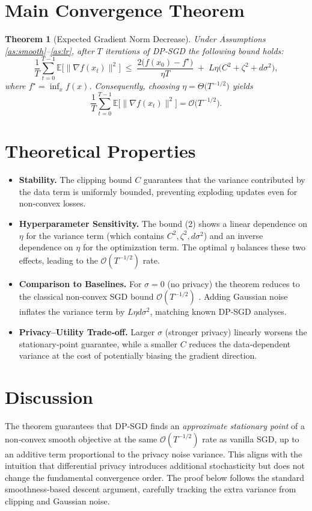 \documentclass[11pt]{article}
\newtheorem{theorem}{Theorem}
\newcommand{\E}{\mathbb{E}}
\newcommand{\grad}{\nabla}
\begin{document}
\section*{Main Convergence Theorem}
\begin{theorem}[Expected Gradient Norm Decrease]\label{thm:main}
Under Assumptions \ref{as:smooth}–\ref{as:lr}, after $T$ iterations of DP‑SGD the following bound holds:
\[
\frac{1}{T}\sum_{t=0}^{T-1}\E\!\bigl[\|\grad f(x_{t})\|^{2}\bigr]
\;\le\;
\frac{2\bigl(f(x_{0})-f^{\star}\bigr)}{\eta T}
\;+\;
L\eta\bigl(C^{2}+\zeta^{2}+d\sigma^{2}\bigr),
\tag{2}
\]
where $f^{\star}=\inf_{x}f(x)$.
Consequently, choosing $\eta=\Theta\!\bigl(T^{-1/2}\bigr)$ yields
\[
\frac{1}{T}\sum_{t=0}^{T-1}\E\!\bigl[\|\grad f(x_{t})\|^{2}\bigr]=\mathcal{O}\!\bigl(T^{-1/2}\bigr).
\]
\end{theorem}

\section*{Theoretical Properties}
\begin{itemize}
\item \textbf{Stability.} The clipping bound $C$ guarantees that the variance contributed by the data term is uniformly bounded, preventing exploding updates even for non‑convex losses.
\item \textbf{Hyperparameter Sensitivity.} The bound (2) shows a linear dependence on $\eta$ for the variance term (which contains $C^{2},\zeta^{2},d\sigma^{2}$) and an inverse dependence on $\eta$ for the optimization term. The optimal $\eta$ balances these two effects, leading to the $\mathcal{O}(T^{-1/2})$ rate.
\item \textbf{Comparison to Baselines.} For $\sigma=0$ (no privacy) the theorem reduces to the classical non‑convex SGD bound $\mathcal{O}(T^{-1/2})$ \cite{Ghadimi2013}. Adding Gaussian noise inflates the variance term by $L\eta d\sigma^{2}$, matching known DP‑SGD analyses.
\item \textbf{Privacy–Utility Trade‑off.} Larger $\sigma$ (stronger privacy) linearly worsens the stationary‑point guarantee, while a smaller $C$ reduces the data‑dependent variance at the cost of potentially biasing the gradient direction.
\end{itemize}

\section*{Discussion}
The theorem guarantees that DP‑SGD finds an \emph{approximate stationary point} of a non‑convex smooth objective at the same $\mathcal{O}(T^{-1/2})$ rate as vanilla SGD, up to an additive term proportional to the privacy noise variance. This aligns with the intuition that differential privacy introduces additional stochasticity but does not change the fundamental convergence order. The proof below follows the standard smoothness‑based descent argument, carefully tracking the extra variance from clipping and Gaussian noise.
\end{document}
